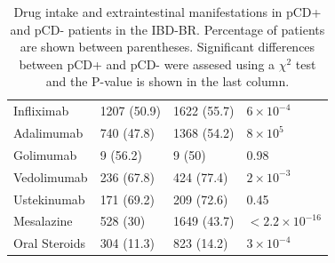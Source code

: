 \begin{table}
\begin{tabular}[t]{llll}
  \hspace{1em}Infliximab & 1207 (50.9) & 1622 (55.7) & $6\times10^{-4}$\\
  \hspace{1em}Adalimumab & 740 (47.8) & 1368 (54.2) & $8\times10^{5}$\\
  \hspace{1em}Golimumab & 9 (56.2) & 9 (50) & 0.98\\
  \hspace{1em}Vedolimumab & 236 (67.8) & 424 (77.4) & $2\times10^{-3}$\\
  \hspace{1em}Ustekinumab & 171 (69.2) & 209 (72.6) & 0.45\\
  \hspace{1em}Mesalazine & 528 (30) & 1649 (43.7) & $< 2.2\times10^{-16}$\\
  \hspace{1em}Oral Steroids & 304 (11.3) & 823 (14.2) & $3\times10^{-4}$\\
 
  \bottomrule
  \end{tabular}
  \caption{Drug intake and extraintestinal manifestations in pCD+ and pCD- patients in the IBD-BR. Percentage of patients are shown between parentheses. Significant differences between pCD+ and pCD- were assesed using a $\chi^{2}$ test and the P-value is shown in the last column.}
  \label{table:drug_eim}
  \end{table}
  
